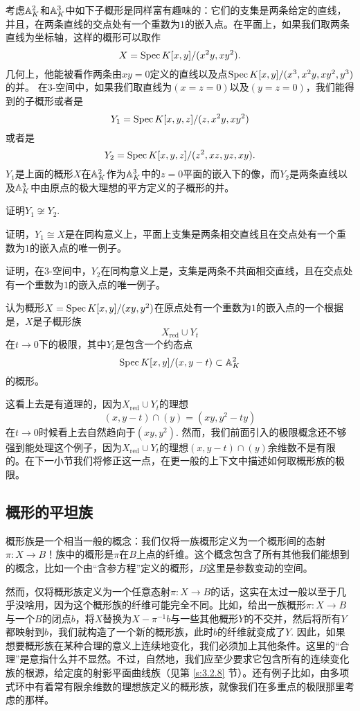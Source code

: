 考虑$\mathbb{A}_K^2$和$\mathbb{A}_K^3$中如下子概形是同样富有趣味的：它们的支集是两条给定的直线，并且，在两条直线的交点处有一个重数为$1$的嵌入点。在平面上，如果我们取两条直线为坐标轴，这样的概形可以取作
\[
	X=\operatorname{Spec} K[x,y]/(x^2y,xy^2).
\]
几何上，他能被看作两条由$xy=0$定义的直线以及点$\operatorname{Spec} K[x,y]/(x^3,x^2y,xy^2,y^3)$的并。 在$3$\hyp 空间中，如果我们取直线为$(x=z=0)$以及$(y=z=0)$，我们能得到的子概形或者是
\[
	Y_1=\operatorname{Spec} K[x,y,z]/(z,x^2y,xy^2)
\]
或者是
\[
	Y_2=\operatorname{Spec} K[x,y,z]/(z^2,xz,yz,xy).
\]
$Y_1$是上面的概形$X$在$\mathbb{A}_K^2$作为$\mathbb{A}_K^3$中的$z=0$平面的嵌入下的像，而$Y_2$是两条直线以及$\mathbb{A}_K^3$中由原点的极大理想的平方定义的子概形的并。

\begin{exe}
	证明$Y_1\not\cong Y_2$.
	\begin{compactenum}[(a)]
		\item 证明，$Y_1\cong X$是在同构意义上，平面上支集是两条相交直线且在交点处有一个重数为$1$的嵌入点的唯一例子。
		\item 证明，在$3$\hyp 空间中，$Y_2$在同构意义上是，支集是两条不共面相交直线，且在交点处有一个重数为$1$的嵌入点的唯一例子。
	\end{compactenum}
\end{exe}

认为概形$X=\operatorname{Spec} K[x,y]/(xy,y^2)$在原点处有一个重数为$1$的嵌入点的一个根据是，$X$是子概形族
\[
	X_{\text{red}}\cup Y_t
\]
在$t\to 0$下的极限，其中$Y_t$是包含一个约态点
\[
	\operatorname{Spec} K[x,y]/(x,y-t)\subset \mathbb{A}_K^2
\]
的概形。

这看上去是有道理的，因为$X_{\text{red}}\cup Y_t$的理想
\[
	(x,y-t)\cap (y)=(xy,y^2-ty)
\]
在$t\to 0$时候看上去自然趋向于$(xy,y^2)$. 然而，我们前面引入的极限概念还不够强到能处理这个例子，因为$X_{\text{red}}\cup Y_t$的理想$(x,y-t)\cap(y)$余维数不是有限的。在下一小节我们将修正这一点，在更一般的上下文中描述如何取概形族的极限。

\subsection{概形的平坦族}\label{s:2.3.4}

概形族是一个相当一般的概念：我们仅将一族概形定义为一个概形间的态射$\pi:X\to B$！族中的概形是$\pi$在$B$上点的纤维。这个概念包含了所有其他我们能想到的概念，比如一个由“含参方程”定义的概形，$B$这里是参数变动的空间。

然而，仅将概形族定义为一个任意态射$\pi:X\to B$的话，这实在太过一般以至于几乎没啥用，因为这个概形族的纤维可能完全不同。比如，给出一族概形$\pi:X\to B$与一个$B$的闭点$b$，将$X$替换为$X-\pi^{-1}b$与一些其他概形$Y$的不交并，然后将所有$Y$都映射到$b$，我们就构造了一个新的概形族，此时$b$的纤维就变成了$Y$. 因此，如果想要概形族在某种合理的意义上连续地变化，我们必须加上其他条件。这里的“合理”是意指什么并不显然。不过，自然地，我们应至少要求它包含所有的连续变化族的根源，给定度的射影平面曲线族（见第 \ref{s:3.2.8} 节）。还有例子比如，由多项式环中有着常有限余维数的理想族定义的概形族，就像我们在多重点的极限那里考虑的那样。

